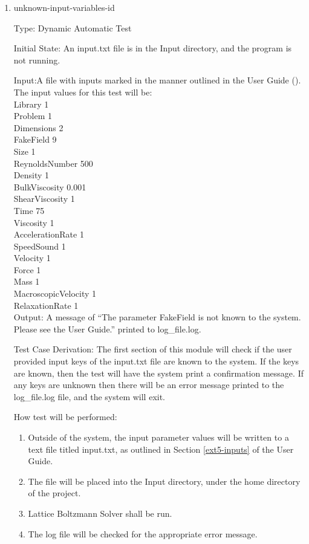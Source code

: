 \documentclass[12pt, titlepage]{article}
\newcommand{\myprogname}{Lattice Boltzmann Solver}
\newcounter{uvtestcounter} %
\begin{document}
\begin{enumerate}
	\item{unknown-input-variables-id\theuvtestcounter\\}
	
	Type: Dynamic Automatic Test

Initial State: An input.txt file is in the Input directory, and the program is not running.

Input:A file with inputs marked in the manner outlined in the
User Guide (\citet{LBM_UserGuide_PM}).\\The input values for this test will
be:\\

Library 1\\
Problem 1\\
Dimensions 2\\
FakeField 9\\
Size 1\\
ReynoldsNumber 500\\
Density 1\\
BulkViscosity 0.001\\
ShearViscosity 1\\
Time 75\\
Viscosity 1\\
AccelerationRate 1\\
SpeedSound 1\\
Velocity 1\\
Force 1\\
Mass 1\\
MacroscopicVelocity 1\\
RelaxationRate 1\\

Output: A message of ``The parameter FakeField is not known to the system. Please see the User Guide.'' printed to log\_file.log.

Test Case Derivation: The first section of this module will check if the user provided input keys of the input.txt file are known to the system. If the keys are known, then the test will have the system print a confirmation message. If any keys are unknown then there will be an error message printed to the log\_file.log file, and the system will exit. 

How test will be performed: 
\begin{enumerate}
	\item Outside of the system, the input parameter values will be written to a text file titled input.txt, as outlined in Section \ref{ext5-inputs} of the User Guide.
	\item The file will be placed into the Input directory, under the home directory of the project.
	\item {\myprogname} shall be run. 
	\item The log file will be checked for the appropriate error message.
\end{enumerate}
		

\end{enumerate}
\end{document}

